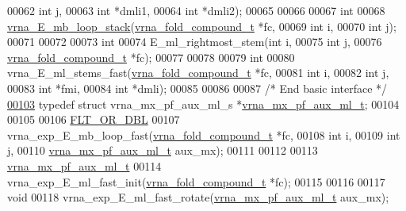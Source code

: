 \begin{DoxyCode}
00062                     \textcolor{keywordtype}{int}                   j,
00063                     \textcolor{keywordtype}{int}                   *dmli1,
00064                     \textcolor{keywordtype}{int}                   *dmli2);
00065 
00066 
00067 \textcolor{keywordtype}{int}
00068 \hyperlink{group__eval__loops__mb_ga91af6d5fcb0aef243a4071cf9e718020}{vrna\_E\_mb\_loop\_stack}(\hyperlink{group__fold__compound_structvrna__fc__s}{vrna\_fold\_compound\_t} *fc,
00069                      \textcolor{keywordtype}{int}                  i,
00070                      \textcolor{keywordtype}{int}                  j);
00071 
00072 
00073 \textcolor{keywordtype}{int}
00074 E\_ml\_rightmost\_stem(\textcolor{keywordtype}{int}                   i,
00075                     \textcolor{keywordtype}{int}                   j,
00076                     \hyperlink{group__fold__compound_structvrna__fc__s}{vrna\_fold\_compound\_t}  *fc);
00077 
00078 
00079 \textcolor{keywordtype}{int}
00080 vrna\_E\_ml\_stems\_fast(\hyperlink{group__fold__compound_structvrna__fc__s}{vrna\_fold\_compound\_t} *fc,
00081                      \textcolor{keywordtype}{int}                  i,
00082                      \textcolor{keywordtype}{int}                  j,
00083                      \textcolor{keywordtype}{int}                  *fmi,
00084                      \textcolor{keywordtype}{int}                  *dmli);
00085 
00086 
00087 \textcolor{comment}{/* End basic interface */}
\hyperlink{group__eval__loops__mb_ga39a8cc1385dcb542a60a9393cde6a1e3}{00103} \textcolor{keyword}{typedef} \textcolor{keyword}{struct }vrna\_mx\_pf\_aux\_ml\_s *\hyperlink{group__eval__loops__mb_ga39a8cc1385dcb542a60a9393cde6a1e3}{vrna\_mx\_pf\_aux\_ml\_t};
00104 
00105 
00106 \hyperlink{group__data__structures_ga31125aeace516926bf7f251f759b6126}{FLT\_OR\_DBL}
00107 vrna\_exp\_E\_mb\_loop\_fast(\hyperlink{group__fold__compound_structvrna__fc__s}{vrna\_fold\_compound\_t}  *fc,
00108                         \textcolor{keywordtype}{int}                   i,
00109                         \textcolor{keywordtype}{int}                   j,
00110                         \hyperlink{group__eval__loops__mb_ga39a8cc1385dcb542a60a9393cde6a1e3}{vrna\_mx\_pf\_aux\_ml\_t}   aux\_mx);
00111 
00112 
00113 \hyperlink{group__eval__loops__mb_ga39a8cc1385dcb542a60a9393cde6a1e3}{vrna\_mx\_pf\_aux\_ml\_t}
00114 vrna\_exp\_E\_ml\_fast\_init(\hyperlink{group__fold__compound_structvrna__fc__s}{vrna\_fold\_compound\_t} *fc);
00115 
00116 
00117 \textcolor{keywordtype}{void}
00118 vrna\_exp\_E\_ml\_fast\_rotate(\hyperlink{group__eval__loops__mb_ga39a8cc1385dcb542a60a9393cde6a1e3}{vrna\_mx\_pf\_aux\_ml\_t} aux\_mx);

\end{DoxyCode}
